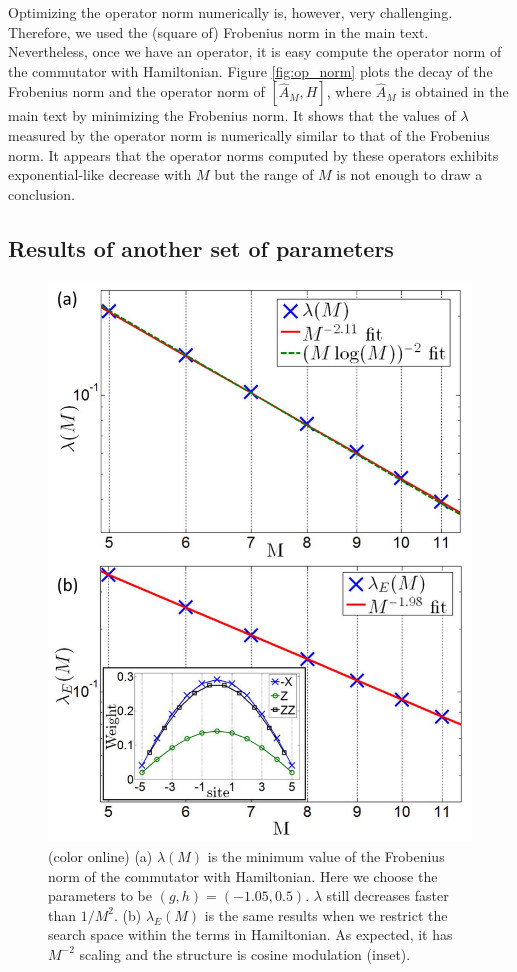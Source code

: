 \documentclass[twocolumn,superscriptaddress, prb]{revtex4-1}
\begin{document}
Optimizing the operator norm numerically is, however, very challenging. Therefore, we used the (square of) Frobenius norm in the main text.
Nevertheless, once we have an operator, it is easy compute the operator norm of the commutator with Hamiltonian.
Figure \ref{fig:op_norm} plots the decay of the Frobenius norm and the operator norm of $[\hat{A}_M,H]$,
where $\hat{A}_M$ is obtained in the main text by minimizing the Frobenius norm.
It shows that the values of $\lambda$ measured by the operator norm is numerically similar to that of the Frobenius norm.
It appears that the operator norms computed by these operators exhibits exponential-like decrease with $M$ but
the range of $M$ is not enough to draw a conclusion.


\subsection{Results of another set of parameters}
\begin{figure}
\includegraphics[width=1.0\linewidth]{fig_hamiltonian_other.pdf}
\centering
\caption{(color online) (a) $\lambda(M)$ is the minimum value of the Frobenius norm of the commutator with Hamiltonian.
Here we choose the parameters to be $(g,h) = (-1.05, 0.5)$. $\lambda$ still decreases faster than $1/M^2$.
(b) $\lambda_E(M)$ is the same results when we restrict the search space within the terms in Hamiltonian.
As expected, it has $M^{-2}$ scaling and the structure is cosine modulation (inset).}
\label{fig:hamiltonian_other}
\end{figure}
\end{document}
